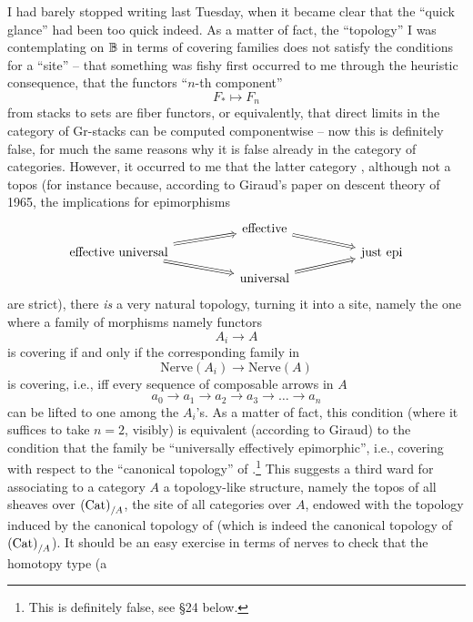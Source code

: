 \bigbreak

\noindent\hfill{}\par

\label{sec:20}%
I had barely stopped writing last Tuesday, when it became clear that
the ``quick glance'' had been too quick indeed. As a matter of fact,
the ``topology'' I was contemplating on ${\mathbb{B}}$ in terms of covering
families does not satisfy the conditions for a ``site'' -- that
something was fishy first occurred to me through the heuristic
consequence, that the functors ``$n$-th component''
\[F_* \mapsto F_n\]
from stacks to sets are fiber functors, or equivalently, that direct
limits in the category of Gr-stacks can be computed componentwise --
now this is definitely false, for much the same reasons why it is
false already in the category \Cat{} of categories. However, it
occurred to me that the latter category \Cat{}, although not a topos
(for instance because, according to Giraud's paper on descent theory
of 1965, the implications for epimorphisms
\[
\begin{tikzcd}[row sep=tiny,column sep=huge,arrows=Rightarrow]
  & \text{effective} \ar[dr] & \\
  \text{effective universal} \ar[ur] \ar[dr] & & \text{just epi} \\
  & \text{universal} \ar[ur]
\end{tikzcd}
\]
are strict), there \emph{is} a very natural topology, turning it into
a site, namely the one where a family of morphisms namely functors
\[ A_i \to A\]
is covering if and only if the corresponding family in \Sssets
\[ \text{Nerve}(A_i) \to \text{Nerve}(A)\]
is covering, i.e., if{f} every sequence of composable arrows in $A$
\[ a_0 \to a_1 \to a_2 \to a_3 \to \dots \to a_n\]
can be lifted to one among the $A_i$'s. As a matter of fact, this
condition (where it suffices to take $n=2$, visibly) is equivalent
(according to Giraud) to the condition that the family be
``universally effectively epimorphic'', i.e., covering with respect to
the ``canonical topology'' of \Cat{}.\footnote{ This is definitely
  false, see \S24 below.} This suggests a third ward for associating
to a category $A$ a topology-like structure, namely the topos of all
sheaves over ${(\mathrm{Cat})}_{/A}$, the site of all categories over $A$,
endowed with the topology induced by the canonical topology of \Cat{}
(which is indeed the canonical topology of ${(\mathrm{Cat})}_{/A}$). It should be
an easy exercise in terms of nerves to check that the homotopy type (a
